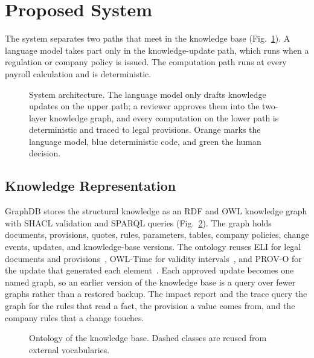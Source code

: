\section{Proposed System}
\label{sec:system}
The system separates two paths that meet in the knowledge base (Fig.~\ref{fig:architecture}). A language model takes part only in the knowledge-update path, which runs when a regulation or company policy is issued. The computation path runs at every payroll calculation and is deterministic.

\begin{figure}[!t]
\centering
\figArchitecture
\caption{System architecture. The language model only drafts knowledge updates on the upper path; a reviewer approves them into the two-layer knowledge graph, and every computation on the lower path is deterministic and traced to legal provisions. Orange marks the language model, blue deterministic code, and green the human decision.}
\label{fig:architecture}
\end{figure}

\subsection{Knowledge Representation}
\label{sec:representation}
GraphDB stores the structural knowledge as an RDF and OWL knowledge graph with SHACL validation and SPARQL queries (Fig.~\ref{fig:ontology}). The graph holds documents, provisions, quotes, rules, parameters, tables, company policies, change events, updates, and knowledge-base versions. The ontology reuses ELI for legal documents and provisions~\cite{publicationsoffice2026elien}, OWL-Time for validity intervals~\cite{cox2017owltime}, and PROV-O for the update that generated each element~\cite{lebo2013provo}. Each approved update becomes one named graph, so an earlier version of the knowledge base is a query over fewer graphs rather than a restored backup. The impact report and the trace query the graph for the rules that read a fact, the provision a value comes from, and the company rules that a change touches.

\begin{figure}[!t]
\centering
\newcommand{\ontologicatatan}{Every pph:KBElement carries elementId, seq, recordedOn ($\approx$ prov:generatedAtTime), validFrom, and validUntil ($\approx$ time:ProperInterval);\\
   one named graph kb:update/\textit{id} per update. pph:Rule carries layer $\in$ \{Regulation, Company\}, modality $\in$ \{Mandatory, Default, Optional\},\\
   scope $\in$ \{Period, Year\}, expression, condition, fixed point, and policy.}

\caption{Ontology of the knowledge base. Dashed classes are reused from external vocabularies.}
\label{fig:ontology}
\end{figure}

